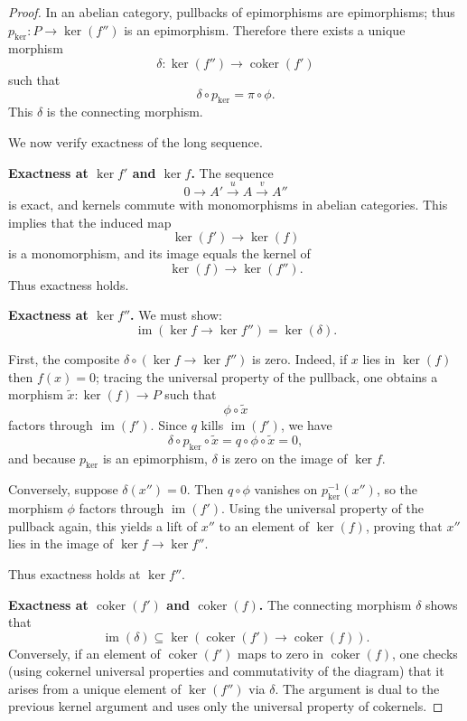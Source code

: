 \documentclass[12pt, oneside]{book}
\begin{document}
\begin{lemma}
\begin{proof}
        In an abelian category, pullbacks of epimorphisms are epimorphisms;
        thus $p_{\ker} : P \to \ker(f'')$ is an epimorphism.
        Therefore there exists a unique morphism
        \[
            \delta : \ker(f'') \longrightarrow \operatorname{coker}(f')
        \]
        such that
        \[
            \delta \circ p_{\ker} = \pi \circ \phi .
        \]
        This $\delta$ is the connecting morphism.

        We now verify exactness of the long sequence.

        \smallskip
        \noindent\textbf{Exactness at $\ker f'$ and $\ker f$.}
        The sequence
        \[
            0 \to A' \xrightarrow{u} A \xrightarrow{v} A''
        \]
        is exact, and kernels commute with monomorphisms in abelian categories.
        This implies that the induced map
        \[
            \ker(f') \longrightarrow \ker(f)
        \]
        is a monomorphism, and its image equals the kernel of
        \[
            \ker(f) \longrightarrow \ker(f'').
        \]
        Thus exactness holds.

        \smallskip
        \noindent\textbf{Exactness at $\ker f''$.}
        We must show:
        \[
            \operatorname{im}(\ker f \to \ker f'') = \ker(\delta).
        \]

        First, the composite $\delta \circ (\ker f \to \ker f'')$ is zero.
        Indeed, if $x$ lies in $\ker(f)$ then $f(x)=0$; tracing the universal property
        of the pullback, one obtains a morphism $\widetilde{x}: \ker(f) \to P$ such that
        \[
            \phi \circ \widetilde{x}
        \]
        factors through $\operatorname{im}(f')$.
        Since $q$ kills $\operatorname{im}(f')$, we have
        \[
            \delta \circ p_{\ker} \circ \widetilde{x}
            = q \circ \phi \circ \widetilde{x}
            = 0,
        \]
        and because $p_{\ker}$ is an epimorphism, $\delta$ is zero on the image of $\ker f$.

        Conversely, suppose $\delta(x'')=0$.
        Then $q \circ \phi$ vanishes on $p_{\ker}^{-1}(x'')$, so the morphism
        $\phi$ factors through $\operatorname{im}(f')$.
        Using the universal property of the pullback again, this yields a lift of $x''$
        to an element of $\ker(f)$, proving that $x''$ lies in the image of
        $\ker f \to \ker f''$.

        Thus exactness holds at $\ker f''$.

        \smallskip
        \noindent\textbf{Exactness at $\operatorname{coker}(f')$ and $\operatorname{coker}(f)$.}
        The connecting morphism $\delta$ shows that
        \[
            \operatorname{im}(\delta) \subseteq \ker(\operatorname{coker}(f') \to \operatorname{coker}(f)).
        \]
        Conversely, if an element of $\operatorname{coker}(f')$ maps to zero in
        $\operatorname{coker}(f)$, one checks (using cokernel universal properties and
        commutativity of the diagram) that it arises from a unique element of $\ker(f'')$ via $\delta$.
        The argument is dual to the previous kernel argument and uses only
        the universal property of cokernels.


\end{proof}
\end{lemma}
\end{document}
